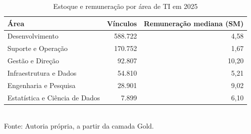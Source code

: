 \begin{table}[htbp]
    \centering
    \caption{Estoque e remuneração por área de TI em 2025}
    \label{tab:areas}
    \footnotesize
    \renewcommand{\arraystretch}{1.25}
    \begin{tabular}{lrr}
        \toprule
        \rowcolor{black!8}
        \textbf{Área} & \textbf{Vínculos} & \textbf{Remuneração mediana (SM)} \\
        \midrule
        Desenvolvimento & 588.722 & 4,58 \\
        Suporte e Operação & 170.752 & 1,67 \\
        Gestão e Direção & 92.807 & 10,20 \\
        Infraestrutura e Dados & 54.810 & 5,21 \\
        Engenharia e Pesquisa & 28.901 & 9,02 \\
        Estatística e Ciência de Dados & 7.899 & 6,10 \\
        \bottomrule
    \end{tabular}
    \\[4pt]
    Fonte: Autoria própria, a partir da camada Gold.
\end{table}
